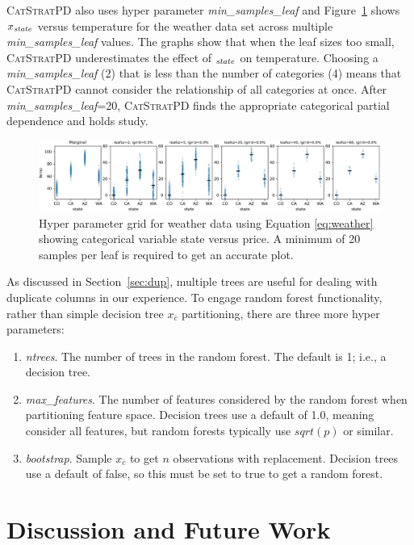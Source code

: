 \documentclass[12pt]{article}
\newcommand{\secref}[1]{Section~\ref{#1}}
\newcommand{\figref}[1]{Figure~\ref{#1}}
\newcommand{\cspd}{\fontfamily{cmr}\textsc{\small CatStratPD}}
\newcommand{\xnc}{$x_{\overline{c}}$}
\begin{document}
\cspd{} also uses hyper parameter {\it min\_samples\_leaf} and \figref{fig:weather_grid} shows $x_{\it state}$ versus temperature for the weather data set across multiple {\it min\_samples\_leaf} values.  The graphs show that when the leaf sizes too small, \cspd{} underestimates the effect of $_{\it state}$ on temperature. Choosing a {\it min\_samples\_leaf} (2) that is less than the number of categories (4) means that \cspd{} cannot consider the relationship of all categories at once. After {\it min\_samples\_leaf}=20, \cspd{} finds the appropriate categorical partial dependence and holds study.

\begin{figure}[htbp]
\begin{center}
\includegraphics[scale=0.55]{images/state_temp_meta.png}
\caption{Hyper parameter grid for weather data using Equation \eqref{eq:weather} showing categorical variable state versus price.  A minimum of 20 samples per leaf is required to get an accurate plot.}
\label{fig:weather_grid}
\end{center}
\end{figure}


As discussed in \secref{sec:dup}, multiple trees are useful for dealing with duplicate columns in our experience. To engage random forest functionality, rather than simple decision tree \xnc{} partitioning, there are three more hyper parameters:

\begin{enumerate}
\item {\it ntrees}. The number of trees in the random forest. The default is 1; i.e., a decision tree.
\item {\it max\_features}. The number of features considered by the random forest when partitioning feature space. Decision trees use a default of 1.0, meaning consider all features, but random forests typically use $sqrt(p)$ or similar.
\item {\it bootstrap}.  Sample \xnc{} to get $n$ observations with replacement. Decision trees use a default of false, so this must be set to true to get a random forest.
\end{enumerate}

\section{Discussion and Future Work}
\end{document}

